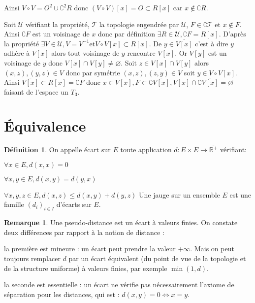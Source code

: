 \documentclass[a4paper, 11pt, french]{book}
\newenvironment{centre}{\center}{\endcenter}
\newenvironment{itemise}{\itemize}{\enditemize}
\theoremstyle{plain} %
\theoremstyle{definition} %
\newtheorem{definition}{Définition}
\newtheorem{remarque}{Remarque}
\theoremstyle{remark} %
\newcommand{\1}{\mathds{1}}
\newcommand\vide{\varnothing}
\newcommand{\inv}[1]{#1^{-1}}
\newcommand{\et}{\mathrel{\mathrm{et}}}
\newcommand{\R}{\mathbb{R}}
\newcommand{\scr}[1]{\mathscr{#1}}
\begin{document}
{\begin{centre}
	\end{centre}
	Ainsi $V\circ V=O^2\cup\complement^2 R$ donc $(V\circ V)[x]=O\subset R[x]$ car $x\notin\complement R$.
}{
	Soit $\scr{U}$ vérifiant la propriété, $\scr{T}$ la topologie engendrée par $\scr{U}$, $F\in\complement\scr{T}$ et $x\notin F$.
	Ainsi $\complement F$ est un voisinage de $x$ donc par définition $\exists R\in\scr{U}, \complement F=R[x]$.
	D'après la propriété $\exists V\in\scr{U}, V=\inv{V}\et V\circ V[x]\subset R[x]$.
	De $y\in\overline{V[x]}$ c'est à dire $y$ adhère à $V[x]$ alors tout voisinage de $y$ rencontre $V[x]$.
	Or $V[y]$ est un voisinage de $y$ donc $V[x]\cap V[y]\neq\vide$.
	Soit $z\in V[x]\cap V[y]$ alors $(x, z), (y, z)\in V$ donc par symétrie $(x, z), (z, y)\in V$ soit $y\in V\circ V[x]$.
	Ainsi $\overline{V[x]}\subset R[x]=\complement F$ donc $x\in V[x], F\subset\complement\overline{V[x]}, V[x]\cap\complement\overline{V[x]}=\vide$ faisant de l'espace un $T_3$.	
}

\section{Équivalence}

\begin{definition}
	On appelle écart sur $E$ toute application $d:E\times E\rightarrow\overline{\R^+}$ vérifiant:
	\begin{itemise}
		\item $\forall x\in E, d(x, x)=0$
		\item $\forall x, y\in E, d(x, y)=d(y, x)$
		\item $\forall x, y, z\in E, d(x, z)\leqslant d(x, y)+d(y, z)$
	\end{itemise}
	Une jauge sur un ensemble $E$ est une famille $(d_i)_{i\in I}$ d'écarts sur $E$.
\end{definition}

\begin{remarque}
	Une pseudo-distance est un écart à valeurs finies.
	On constate deux différences par rapport à la notion de distance :
	\begin{itemise}
		\item la première est mineure : un écart peut prendre la valeur $+\infty$.
		Mais on peut toujours remplacer $d$ par un écart équivalent (du point de vue de la topologie et de la structure uniforme) à valeurs finies, par exemple $\min(1, d)$.
		\item la seconde est essentielle : un écart ne vérifie pas nécessairement l'axiome de séparation pour les distances, qui est : $d(x, y) = 0\iff x = y$.
	\end{itemise}
\end{remarque}
\end{document}
